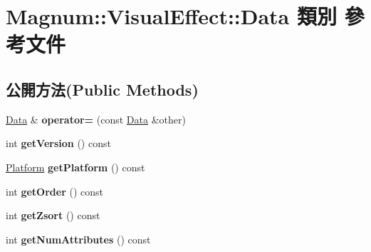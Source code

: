 \hypertarget{class_magnum_1_1_visual_effect_1_1_data}{}\section{Magnum\+:\+:Visual\+Effect\+:\+:Data 類別 參考文件}
\label{class_magnum_1_1_visual_effect_1_1_data}
\subsection*{公開方法(Public Methods)}
\begin{DoxyCompactItemize}
\item 
\hyperlink{class_magnum_1_1_visual_effect_1_1_data}{Data} \& {\bfseries operator=} (const \hyperlink{class_magnum_1_1_visual_effect_1_1_data}{Data} \&other)\hypertarget{class_magnum_1_1_visual_effect_1_1_data_af3d138454e94cb1adb72c30f2e3cef0b}{}\label{class_magnum_1_1_visual_effect_1_1_data_af3d138454e94cb1adb72c30f2e3cef0b}

\item 
int {\bfseries get\+Version} () const \hypertarget{class_magnum_1_1_visual_effect_1_1_data_ae05ce8435c5a81dcbd5275ad9945d715}{}\label{class_magnum_1_1_visual_effect_1_1_data_ae05ce8435c5a81dcbd5275ad9945d715}

\item 
\hyperlink{class_magnum_1_1_platform}{Platform} {\bfseries get\+Platform} () const \hypertarget{class_magnum_1_1_visual_effect_1_1_data_aef807952caa8612212a9102771bcf017}{}\label{class_magnum_1_1_visual_effect_1_1_data_aef807952caa8612212a9102771bcf017}

\item 
int {\bfseries get\+Order} () const \hypertarget{class_magnum_1_1_visual_effect_1_1_data_a72870398ac9c09fb19c5cd0fb415e675}{}\label{class_magnum_1_1_visual_effect_1_1_data_a72870398ac9c09fb19c5cd0fb415e675}

\item 
int {\bfseries get\+Zsort} () const \hypertarget{class_magnum_1_1_visual_effect_1_1_data_a62575ddeeac625823e27ac692490b5b3}{}\label{class_magnum_1_1_visual_effect_1_1_data_a62575ddeeac625823e27ac692490b5b3}

\item 
int {\bfseries get\+Num\+Attributes} () const \hypertarget{class_magnum_1_1_visual_effect_1_1_data_aad4610b6b23245b1e9d53a8c31890547}{}\label{class_magnum_1_1_visual_effect_1_1_data_aad4610b6b23245b1e9d53a8c31890547}


\end{DoxyCompactItemize}
